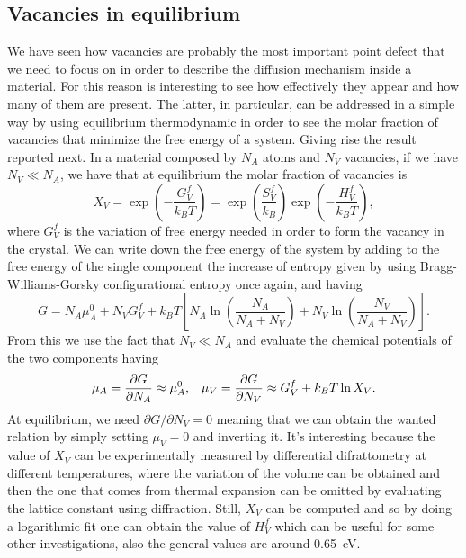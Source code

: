 \subsection{Vacancies in equilibrium}

We have seen how vacancies are probably the most important point defect that we need to focus on in order to describe the diffusion mechanism inside a material. For this reason is interesting to see how effectively they appear and how many of them are present. The latter, in particular, can be addressed in a simple way by using equilibrium thermodynamic in order to see the molar fraction of vacancies that minimize the free energy of a system. Giving rise the result reported next.
{
    In a material composed by $N_A$ atoms and $N_V$ vacancies, if we have $N_V \ll N_A$, we have that at equilibrium the molar fraction of vacancies is
    \begin{equation}
        \label{eq:VacancyPresence}
        X_V = \exp\left( -\frac{G_V^f}{k_BT} \right) = \exp\left( \frac{S_V^f}{k_B} \right)\exp\left( -\frac{H_V^f}{k_BT} \right),
    \end{equation} 
    where $G_V^f$ is the variation of free energy needed in order to form the vacancy in the crystal.
}
{
    We can write down the free energy of the system by adding to the free energy of the single component the increase of entropy given by using Bragg-Williams-Gorsky configurational entropy once again, and having
    \begin{equation}
        G = N_A\mu_A^0 + N_V G_V^f + k_BT\left[ N_A\ln\left( \frac{N_A}{N_A + N_V} \right) + N_V\ln\left( \frac{N_V}{N_A + N_V} \right) \right].
    \end{equation}
    From this we use the fact that $N_V \ll N_A$ and evaluate the chemical potentials of the two components having
    \begin{align}
        &\mu_A = \pdv{G}{N_A} \approx \mu_A^0, &\mu_V = \pdv{G}{N_V} \approx G_V^f + k_BT\ln X_V.
    \end{align}
    At equilibrium, we need $\partial G/\partial N_V = 0$ meaning that we can obtain the wanted relation by simply setting $\mu_V = 0$ and inverting it.
}
\noindent
It's interesting because the value of $X_V$ can be experimentally measured by differential difrattometry at different temperatures, where the variation of the volume can be obtained and then the one that comes from thermal expansion can be omitted by evaluating the lattice constant using diffraction. Still, $X_V$ can be computed and so by doing a logarithmic fit one can obtain the value of $H_V^f$ which can be useful for some other investigations, also the general values are around \SI{0.65}{\electronvolt}.

